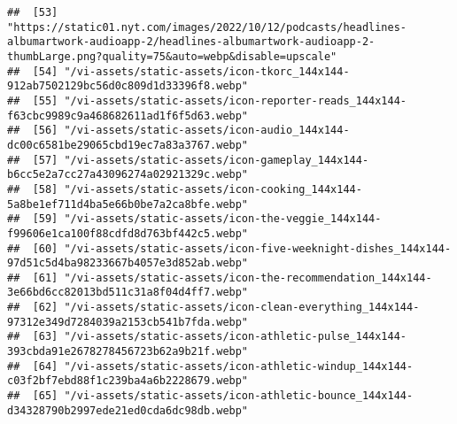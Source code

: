 \documentclass[
]{article}
\begin{document}
\begin{verbatim}
##  [53] "https://static01.nyt.com/images/2022/10/12/podcasts/headlines-albumartwork-audioapp-2/headlines-albumartwork-audioapp-2-thumbLarge.png?quality=75&auto=webp&disable=upscale"                         
##  [54] "/vi-assets/static-assets/icon-tkorc_144x144-912ab7502129bc56d0c809d1d33396f8.webp"                                                                                                                   
##  [55] "/vi-assets/static-assets/icon-reporter-reads_144x144-f63cbc9989c9a468682611ad1f6f5d63.webp"                                                                                                          
##  [56] "/vi-assets/static-assets/icon-audio_144x144-dc00c6581be29065cbd19ec7a83a3767.webp"                                                                                                                   
##  [57] "/vi-assets/static-assets/icon-gameplay_144x144-b6cc5e2a7cc27a43096274a02921329c.webp"                                                                                                                
##  [58] "/vi-assets/static-assets/icon-cooking_144x144-5a8be1ef711d4ba5e66b0be7a2ca8bfe.webp"                                                                                                                 
##  [59] "/vi-assets/static-assets/icon-the-veggie_144x144-f99606e1ca100f88cdfd8d763bf442c5.webp"                                                                                                              
##  [60] "/vi-assets/static-assets/icon-five-weeknight-dishes_144x144-97d51c5d4ba98233667b4057e3d852ab.webp"                                                                                                   
##  [61] "/vi-assets/static-assets/icon-the-recommendation_144x144-3e66bd6cc82013bd511c31a8f04d4ff7.webp"                                                                                                      
##  [62] "/vi-assets/static-assets/icon-clean-everything_144x144-97312e349d7284039a2153cb541b7fda.webp"                                                                                                        
##  [63] "/vi-assets/static-assets/icon-athletic-pulse_144x144-393cbda91e2678278456723b62a9b21f.webp"                                                                                                          
##  [64] "/vi-assets/static-assets/icon-athletic-windup_144x144-c03f2bf7ebd88f1c239ba4a6b2228679.webp"                                                                                                         
##  [65] "/vi-assets/static-assets/icon-athletic-bounce_144x144-d34328790b2997ede21ed0cda6dc98db.webp"                                                                                                         

\end{verbatim}
\end{document}
